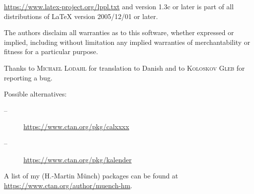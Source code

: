 \documentclass{article}
\begin{document}
\url{https://www.latex-project.org/lppl.txt}\newline
and version 1.3c or later is part of all distributions of \LaTeX{} version
2005/12/01 or later.

The authors disclaim all warranties as to this software, whether expressed or
implied, including without limitation any implied warranties of
merchantability or fitness for a particular purpose.

Thanks to \textsc{Michael Lodahl} for translation to Danish and
to \textsc{Koloskov Gleb} for reporting a bug.

\noindent Possible alternatives:
\begin{description}
\item[--] \url{https://www.ctan.org/pkg/calxxxx}
\item[--] \url{https://www.ctan.org/pkg/kalender}
\end{description}

\noindent A list of my (H.-Martin M\"{u}nch) packages can be found at\newline
\url{https://www.ctan.org/author/muench-hm}.
\end{document}
